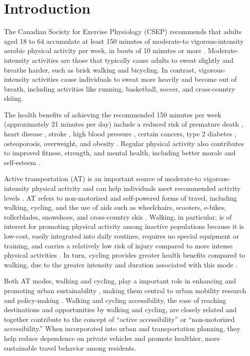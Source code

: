 \documentclass[preprint, 3p,
authoryear]{elsarticle} %
\begin{document}
\section{Introduction}\label{introduction}

The Canadian Society for Exercise Physiology (CSEP) recommends that
adults aged 18 to 64 accumulate at least 150 minutes of moderate-to
vigorous-intensity aerobic physical activity per week, in bouts of 10
minutes or more \citep{csep2012}. Moderate-intensity activities are
those that typically cause adults to sweat slightly and breathe harder,
such as brisk walking and bicycling. In contrast, vigorous-intensity
activities cause individuals to sweat more heavily and become out of
breath, including activities like running, basketball, soccer, and
cross-country skiing.

The health benefits of achieving the recommended 150 minutes per week
(approximately 21 minutes per day) include a reduced risk of premature
death \citep{hakim1998effects}, heart disease
\citep{lacroix1996, hakim1999}, stroke \citep{hu2000}, high blood
pressure \citep{dunn1999}, certain cancers, type 2 diabetes
\citep{hu1999}, osteoporosis, overweight, and obesity
\citep{fogelholm2000}. Regular physical activity also contributes to
improved fitness, strength, and mental health, including better morale
and self-esteem \citep{csep2012}.

Active transportation (AT) is an important source of moderate-to
vigorous-intensity physical activity and can help individuals meet
recommended activity levels \citep{bryan2009}. AT refers to
non-motorized and self-powered forms of travel, including walking,
cycling, and the use of aids such as wheelchairs, scooters, e-bikes,
rollerblades, snowshoes, and cross-country skis \citep{csep2012}.
Walking, in particular, is of interest for promoting physical activity
among inactive populations because it is low-cost, easily integrated
into daily routines, requires no special equipment or training, and
carries a relatively low risk of injury compared to more intense
physical activities \citep{hootman2001, bryan2009}. In turn, cycling
provides greater health benefits compared to walking, due to the greater
intensity and duration associated with this mode
\citep{martin2014, barajas2021, borhani2024, celismorales2017}.

Both AT modes, walking and cycling, play a important role in enhancing
and promoting urban sustainability
\citep{hino2014built, lamiquiz2015effects}, making them central to urban
mobility research and policy-making
\citep{vandenbulcke2009mapping, wu2019measuring}. Walking and cycling
accessibility, the ease of reaching destinations and opportunities
\citep{hansen1959, paez2012} by walking and cycling, are closely related
and together contribute to the concept of ``active accessibility'' or
``non-motorized accessibility.'' When incorporated into urban and
transportation planning, they help reduce dependence on private vehicles
and promote healthier, more sustainable travel behavior among residents.
\end{document}
